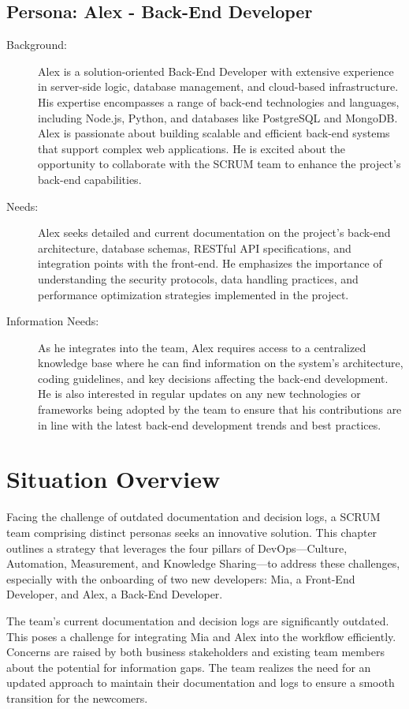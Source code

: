 \subsection*{Persona: Alex - Back-End Developer}
\begin{description}
    \item[Background:] Alex is a solution-oriented Back-End Developer with extensive experience in server-side logic, database management, and cloud-based infrastructure. His expertise encompasses a range of back-end technologies and languages, including Node.js, Python, and databases like PostgreSQL and MongoDB. Alex is passionate about building scalable and efficient back-end systems that support complex web applications. He is excited about the opportunity to collaborate with the SCRUM team to enhance the project's back-end capabilities.
    \item[Needs:] Alex seeks detailed and current documentation on the project's back-end architecture, database schemas, RESTful API specifications, and integration points with the front-end. He emphasizes the importance of understanding the security protocols, data handling practices, and performance optimization strategies implemented in the project.
    \item[Information Needs:] As he integrates into the team, Alex requires access to a centralized knowledge base where he can find information on the system's architecture, coding guidelines, and key decisions affecting the back-end development. He is also interested in regular updates on any new technologies or frameworks being adopted by the team to ensure that his contributions are in line with the latest back-end development trends and best practices.
\end{description}



\section{Situation Overview}

Facing the challenge of outdated documentation and decision logs, a SCRUM team comprising distinct personas seeks an innovative solution. This chapter outlines a strategy that leverages the four pillars of DevOps—Culture, Automation, Measurement, and Knowledge Sharing—to address these challenges, especially with the onboarding of two new developers: Mia, a Front-End Developer, and Alex, a Back-End Developer.

The team's current documentation and decision logs are significantly outdated. This poses a challenge for integrating Mia and Alex into the workflow efficiently. Concerns are raised by both business stakeholders and existing team members about the potential for information gaps. The team realizes the need for an updated approach to maintain their documentation and logs to ensure a smooth transition for the newcomers.

